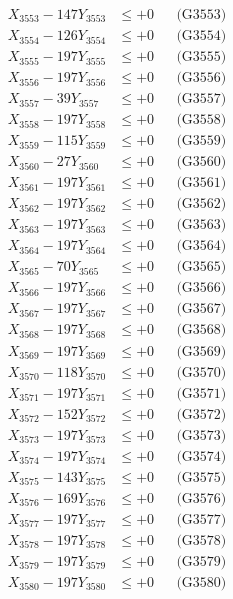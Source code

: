 \documentclass[a4paper,10pt]{article}
\begin{document}
{\begin{align}
X_{3553} - 147Y_{3553} &\leq +0 && \text{(G3553)} \\
X_{3554} - 126Y_{3554} &\leq +0 && \text{(G3554)} \\
X_{3555} - 197Y_{3555} &\leq +0 && \text{(G3555)} \\
X_{3556} - 197Y_{3556} &\leq +0 && \text{(G3556)} \\
X_{3557} - 39Y_{3557} &\leq +0 && \text{(G3557)} \\
X_{3558} - 197Y_{3558} &\leq +0 && \text{(G3558)} \\
X_{3559} - 115Y_{3559} &\leq +0 && \text{(G3559)} \\
X_{3560} - 27Y_{3560} &\leq +0 && \text{(G3560)} \\
\allowbreak
X_{3561} - 197Y_{3561} &\leq +0 && \text{(G3561)} \\
X_{3562} - 197Y_{3562} &\leq +0 && \text{(G3562)} \\
X_{3563} - 197Y_{3563} &\leq +0 && \text{(G3563)} \\
X_{3564} - 197Y_{3564} &\leq +0 && \text{(G3564)} \\
X_{3565} - 70Y_{3565} &\leq +0 && \text{(G3565)} \\
X_{3566} - 197Y_{3566} &\leq +0 && \text{(G3566)} \\
X_{3567} - 197Y_{3567} &\leq +0 && \text{(G3567)} \\
X_{3568} - 197Y_{3568} &\leq +0 && \text{(G3568)} \\
X_{3569} - 197Y_{3569} &\leq +0 && \text{(G3569)} \\
X_{3570} - 118Y_{3570} &\leq +0 && \text{(G3570)} \\
\allowbreak
X_{3571} - 197Y_{3571} &\leq +0 && \text{(G3571)} \\
X_{3572} - 152Y_{3572} &\leq +0 && \text{(G3572)} \\
X_{3573} - 197Y_{3573} &\leq +0 && \text{(G3573)} \\
X_{3574} - 197Y_{3574} &\leq +0 && \text{(G3574)} \\
X_{3575} - 143Y_{3575} &\leq +0 && \text{(G3575)} \\
X_{3576} - 169Y_{3576} &\leq +0 && \text{(G3576)} \\
X_{3577} - 197Y_{3577} &\leq +0 && \text{(G3577)} \\
X_{3578} - 197Y_{3578} &\leq +0 && \text{(G3578)} \\
X_{3579} - 197Y_{3579} &\leq +0 && \text{(G3579)} \\
X_{3580} - 197Y_{3580} &\leq +0 && \text{(G3580)} \\

\end{align}}
\end{document}
